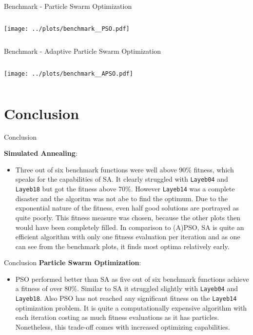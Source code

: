 \documentclass[11pt,aspectratio=169]{beamer}
\begin{document}
\begin{frame}[fragile]{Benchmark - Particle Swarm Optimization}
    \begin{columns}
    \begin{column}{0.8\textwidth}
        \texttt{[image: ../plots/benchmark\_\_PSO.pdf]}
    \end{column}
    \end{columns}
\end{frame}

\begin{frame}[fragile]{Benchmark - Adaptive Particle Swarm Optimization}
    \begin{columns}
    \begin{column}{0.8\textwidth}
        \texttt{[image: ../plots/benchmark\_\_APSO.pdf]}
    \end{column}
    \end{columns}
\end{frame}

\section{Conclusion}

\begin{closingframe}{Conclusion}

    \textbf{Simulated Annealing}:
    \begin{itemize}
        \item Three out of six benchmark functions were well above $90$\% fitness, which speaks for the capabilities of SA. It clearly struggled with \texttt{Layeb04} and \texttt{Layeb18} but got the fitness above $70$\%. However \texttt{Layeb14} was a complete disaster and the algoritm was not abe to find the optimum. Due to the exponential nature of the fitness, even half good solutions are portrayed as quite poorly. This fitness measure was chosen, because the other plots then would have been completely filled. In comparison to (A)PSO, SA is quite an efficient algorithm with only one fitness evaluation per iteration and as one can see from the benchmark plots, it finds most optima relatively early.
    \end{itemize}
\end{closingframe}

\begin{closingframe}{Conclusion}
    \textbf{Particle Swarm Optimization}:
    \begin{itemize}
        \item PSO performed better than SA as five out of six benchmark functions achieve a fitness of over $80$\%. Similar to SA it struggled slightly with \texttt{Layeb04} and \texttt{Layeb18}. Also PSO has not reached any significant fitness on the \texttt{Layeb14} optimization problem. It is quite a computationally expensive algorithm with each iteration costing as much fitness evaluations as it has particles. Nonetheless, this trade-off comes with increased optimizing capabilities.
    \end{itemize}
\end{closingframe}
\end{document}
